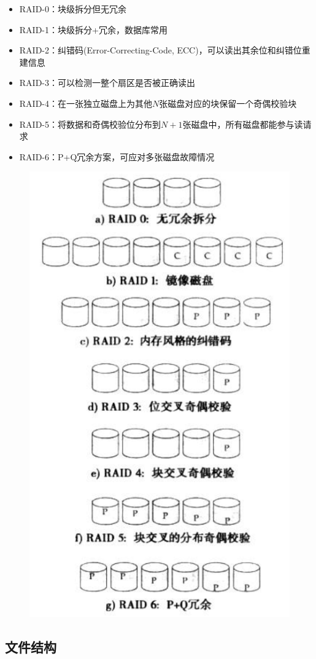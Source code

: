 \begin{minipage}[H]{0.5\linewidth}
\begin{itemize}
	\item RAID-0：块级拆分但无冗余
	\item RAID-1：块级拆分+冗余，数据库常用
	\item RAID-2：纠错码(Error-Correcting-Code, ECC)，可以读出其余位和纠错位重建信息
	\item RAID-3：可以检测一整个扇区是否被正确读出
	\item RAID-4：在一张独立磁盘上为其他$N$张磁盘对应的块保留一个奇偶校验块
	\item RAID-5：将数据和奇偶校验位分布到$N+1$张磁盘中，所有磁盘都能参与读请求
	\item RAID-6：P+Q冗余方案，可应对多张磁盘故障情况
\end{itemize}
\end{minipage}
\begin{minipage}[H]{0.5\linewidth}
\begin{figure}[H]
\centering
\includegraphics[width=0.5\linewidth]{fig/RAID.png}
\end{figure}
\end{minipage}

\subsection{文件结构}
